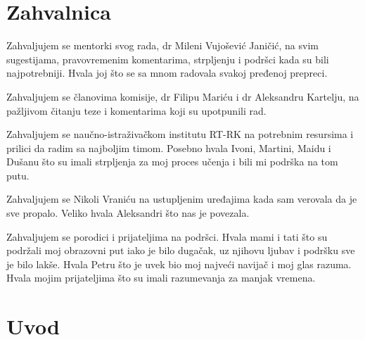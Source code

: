 \documentclass[12pt,oneside]{memoir}
\begin{document}
\frontmatter

\naslovna

\komisija
\chapter*{Zahvalnica}
Zahvaljujem se mentorki svog rada, dr Mileni Vujošević Janičić, na svim sugestijama, pravovremenim komentarima, strpljenju i podršci kada su bili najpotrebniji. Hvala joj što se sa mnom radovala svakoj pređenoj prepreci.

Zahvaljujem se članovima komisije, dr Filipu Mariću i dr Aleksandru Kartelju, na pažljivom čitanju teze i komentarima koji su upotpunili rad.

Zahvaljujem se naučno-istraživačkom institutu RT-RK na potrebnim resursima i prilici da radim sa najboljim timom. Posebno hvala Ivoni, Martini, Maidu i Dušanu što su imali strpljenja za moj proces učenja i bili mi podrška na tom putu.

Zahvaljujem se Nikoli Vraniću na ustupljenim uređajima kada sam verovala da je sve propalo. Veliko hvala Aleksandri što nas je povezala.

Zahvaljujem se porodici i prijateljima na podršci. Hvala mami i tati što su podržali moj obrazovni put iako je bilo dugačak, uz njihovu ljubav i podršku sve je bilo lakše.
Hvala Petru što je uvek bio moj najveći navijač i moj glas razuma. Hvala mojim prijateljima što su imali razumevanja za manjak vremena.


\apstrakt

\tableofcontents*

\mainmatter

\chapter{Uvod}

\end{document}
